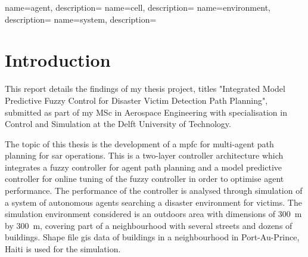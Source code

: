 \documentclass[conference]{IEEEtran}
\begin{document}




{
    name=agent,
    description={}
}
{
    name=cell,
    description={}
}
{
    name=environment,
    description={}
}
{
    name=system,
    description={}
}


\printnomenclature

\section{Introduction} \label{sec:introduction}

This report details the findings of my thesis project, titles "Integrated Model Predictive Fuzzy Control for Disaster Victim Detection Path Planning", submitted as part of my MSc in Aerospace Engineering with specialisation in Control and Simulation at the Delft University of Technology.

The topic of this thesis is the development of a \gls{mpfc} for multi-agent path planning for \gls{sar} operations.
This is a two-layer controller architecture which integrates a fuzzy controller for agent path planning and a model predictive controller for online tuning of the fuzzy controller in order to optimise agent performance.
The performance of the controller is analysed through simulation of a system of autonomous agents searching a disaster environment for victims.
The simulation environment considered is an outdoors area with dimensions of \SI{300}{\meter} by \SI{300}{\meter}, covering part of a neighbourhood with several streets and dozens of buildings.
Shape file \gls{gis} data of buildings in a neighbourhood in Port-Au-Prince, Haiti is used for the simulation.
\end{document}
